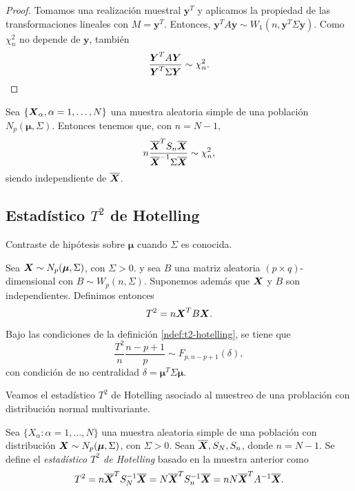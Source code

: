 \begin{proof}
  Tomamos una realización muestral \(\boldsymbol y^T\) y aplicamos la propiedad de las transformaciones lineales con \(M = \boldsymbol y^T\). 
  Entonces, \(\boldsymbol y^T A \boldsymbol y \sim W_1(n, \boldsymbol y^T\Sigma \boldsymbol y)\). 
  Como \(\chi_n^2\) no depende de \(\boldsymbol y\), también
  \[
    \frac{\boldsymbol{Y}^T A\boldsymbol{Y}}{\boldsymbol{Y}^T\Sigma\boldsymbol{Y}} \sim \chi_n^2.
  \]
\end{proof}

\begin{ncor}
  Sea \(\{\boldsymbol{X}_{\alpha}, \alpha = 1, \dots, N\}\) una muestra aleatoria simple de una población \(N_p(\boldsymbol \mu, \Sigma)\). 
  Entonces tenemos que, con \(n = N -1\),
  \[
    n\frac{\overline{\boldsymbol{X}}^T S_n \overline{\boldsymbol{X}}}{\overline{\boldsymbol{X}}^{-1}\Sigma\overline{\boldsymbol{X}}} \sim \chi_n^2,
  \]
  siendo independiente de \(\overline{\boldsymbol{X}}\).
\end{ncor}

\subsection{Estadístico \(T^2\) de Hotelling}

Contraste de hipótesis sobre \(\boldsymbol \mu\) cuando \(\Sigma\) es conocida.

\begin{ndef}
  \label{ndef:t2-hotelling}
  Sea \(\boldsymbol{X} \sim N_p(\boldsymbol \mu, \Sigma)\), con \(\Sigma > 0\). y sea \(B\) una matriz aleatoria \((p\times q)\)-dimensional con \(B \sim W_p(n, \Sigma)\).
  Suponemos además que \(\boldsymbol{X}\) y \(B\) son independientes.
  Definimos entonces 
  \[
    T^2 = n\boldsymbol{X}^T B\boldsymbol{X}.
  \]
\end{ndef}

\begin{nprop}
  Bajo las condiciones de la definición \ref{ndef:t2-hotelling}, se tiene que
  \[
    \frac{T^2}{n}\frac{n-p+1}{p} \sim F_{p, n-p+1}(\delta),
  \]
  con condición de no centralidad \(\delta = \boldsymbol \mu^T \Sigma \boldsymbol \mu\).
\end{nprop}


Veamos el estadístico \(T^2\) de Hotelling asociado al muestreo de una problación con distribución normal multivariante.

\begin{ndef}
  \label{ndef:t2-hotelling-muestreo}
  Sea \(\{X_\alpha : \alpha = 1,\dots,N\}\) una muestra aleatoria simple de una población con distribución \(\boldsymbol{X} \sim N_p(\boldsymbol \mu, \Sigma)\), con \(\Sigma > 0\). 
  Sean \(\overline{\boldsymbol{X}}, S_N, S_n\), donde \(n = N-1\).
  Se define el \textit{estadístico \(T^2\) de Hotelling} basado en la muestra anterior como
  \[
    T^2 = n\overline{\boldsymbol{X}}^TS_N^{-1}\overline{\boldsymbol{X}} = N\overline{\boldsymbol{X}}^TS_n^{-1}\overline{\boldsymbol{X}} = nN\overline{\boldsymbol{X}}^TA^{-1}\overline{\boldsymbol{X}}.
  \]
\end{ndef}

